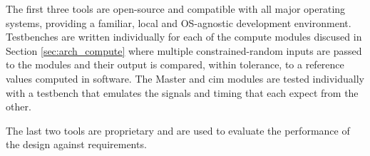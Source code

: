 The first three tools are open-source and compatible with all major operating systems, providing a familiar, local and OS-agnostic development environment. Testbenches are written
individually for each of the compute modules discused in Section \ref{sec:arch_compute} where multiple constrained-random inputs are passed to the modules and their output is
compared, within tolerance, to a reference values computed in software. The Master and \ac{cim} modules are tested individually with a testbench that emulates the signals and timing
that each expect from the other.

The last two tools are proprietary and are used to evaluate the performance of the design against requirements.
